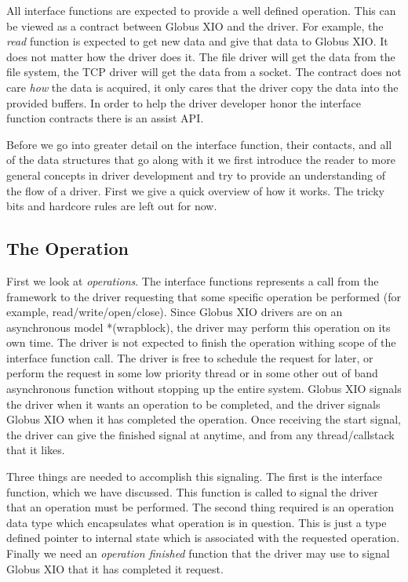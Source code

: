 \documentclass[11pt]{article}
\begin{document}
All interface functions are expected to provide a well defined operation.
This can be viewed as a contract between Globus XIO and the driver.
For example, the \emph{read} function is expected to get new data
and give that data to Globus XIO.  It does not matter how the driver
does it.  The file driver will get the data from the file system, the
TCP driver will get the data from a socket.  The contract does not
care \emph{how} the data is acquired, it only cares that the driver
copy the data into the provided buffers.  In order to help the driver 
developer honor the interface function contracts
there is an assist API.  

Before we go into greater detail on the interface function, their contacts,
and all of the data structures that go along with it we first introduce
the reader to more general concepts in driver development and try to 
provide an understanding of the flow of a driver.
First we give a quick overview of how it works.  
The tricky bits and hardcore rules are left out for now.

\subsection{The Operation}
First we look at \emph{operations}.  The interface functions
represents a call from the framework to the driver requesting that some
specific operation be performed (for example, read/write/open/close).  
Since Globus XIO drivers are on an 
asynchronous model *(wrapblock), the driver may perform 
this operation on its own time.  The driver
is not expected to finish the operation withing scope of the interface
function call.  The driver is free to schedule the request for later, 
or perform the request in some low priority thread or in some other out
of band asynchronous function without stopping up the entire system.
Globus XIO signals the driver when it wants an operation
to be completed, and the driver signals Globus XIO when it has 
completed the operation.  Once receiving the start signal, the driver
can give the finished signal at anytime, and from any thread/callstack
that it likes.

Three things are needed to accomplish this signaling.  The first is the
interface function, which we have discussed.  This function is called
to signal the driver that an operation must be performed.  The second
thing required is an operation data type which encapsulates what operation
is in question.  This is just a type defined pointer to internal state
which is associated with the requested operation.  Finally we need 
an \emph{operation finished} function that the driver
may use to signal Globus XIO that it has completed it request.
\end{document}
